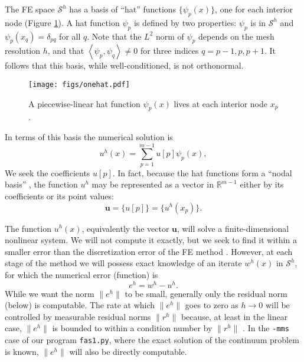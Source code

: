 \documentclass[letterpaper,final,12pt,reqno]{amsart}
\newcommand{\RR}{\mathbb{R}}
\newcommand{\bu}{\mathbf{u}}
\newcommand{\ip}[2]{\left<#1,#2\right>}
\begin{document}
The FE space $\mathcal{S}^h$ has a basis of ``hat'' functions $\{\psi_p(x)\}$, one for each interior node (Figure \ref{fig:onehat}).  A hat function $\psi_p$ is defined by two properties: $\psi_p$ is in $\mathcal{S}^h$ and $\psi_p(x_q)=\delta_{pq}$ for all $q$.  Note that the $L^2$ norm of $\psi_p$ depends on the mesh resolution $h$, and that $\ip{\psi_p}{\psi_q}\ne 0$ for three indices $q=p-1,p,p+1$.  It follows that this basis, while well-conditioned, is not orthonormal.

\begin{figure}
\texttt{[image: figs/onehat.pdf]}
\caption{A piecewise-linear hat function $\psi_p(x)$ lives at each interior node $x_p$.}
\label{fig:onehat}
\end{figure}

In terms of this basis the numerical solution is
\begin{equation}
  u^h(x) = \sum_{p=1}^{m-1} u[p] \psi_p(x),  \label{fesolution}
\end{equation}
We seek the coefficients $u[p]$.  In fact, because the hat functions form a ``nodal basis'' \cite{Elmanetal2014}, the function $u^h$ may be represented as a vector in $\RR^{m-1}$ either by its coefficients or its point values:
\begin{equation}
\bu =\{u[p]\} = \{u^h(x_p)\}.  \label{fevector}
\end{equation}

The function $u^h(x)$, equivalently the vector $\bu$, will solve a finite-dimensional nonlinear system.  We will not compute it exactly, but we seek to find it within a smaller error than the discretization error of the FE method \cite{Elmanetal2014}.  However, at each stage of the method we will possess exact knowledge of an iterate $w^h(x)$ in $\mathcal{S}^h$, for which the numerical error (function) is
\begin{equation}
  e^h = w^h - u^h.  \label{feerror}
\end{equation}
While we want the norm $\|e^h\|$ to be small, generally only the residual norm (below) is computable.  The rate at which $\|e^h\|$ goes to zero as $h\to 0$ will be controlled by measurable residual norms $\|r^h\|$ because, at least in the linear case, $\|e^h\|$ is bounded to within a condition number by $\|r^h\|$ \cite[Chapter 2]{Bueler2021}.  In the \texttt{-mms} case of our program \texttt{fas1.py}, where the exact solution of the continuum problem is known, $\|e^h\|$ will also be directly computable.
\end{document}
